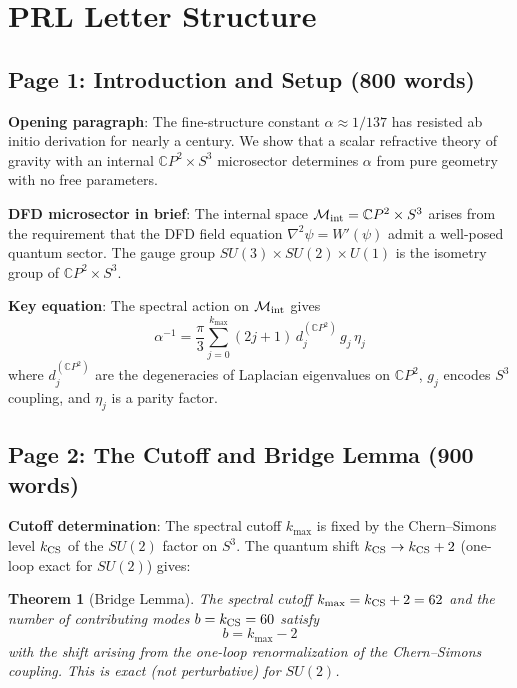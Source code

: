 \documentclass[11pt,a4paper]{article}
\newtheorem{theorem}{Theorem}
\newcommand{\CP}{\mathbb{C}P}
\begin{document}
\section{PRL Letter Structure}

\subsection{Page 1: Introduction and Setup (800 words)}

\textbf{Opening paragraph}: The fine-structure constant $\alpha \approx 1/137$ has resisted ab initio derivation for nearly a century. We show that a scalar refractive theory of gravity with an internal $\CP^2 \times S^3$ microsector determines $\alpha$ from pure geometry with no free parameters.

\textbf{DFD microsector in brief}: The internal space $\mathcal{M}_{\rm int} = \CP^2 \times S^3$ arises from the requirement that the DFD field equation $\nabla^2 \psi = W'(\psi)$ admit a well-posed quantum sector. The gauge group $SU(3) \times SU(2) \times U(1)$ is the isometry group of $\CP^2 \times S^3$.

\textbf{Key equation}: The spectral action on $\mathcal{M}_{\rm int}$ gives
\begin{equation}
\alpha^{-1} = \frac{\pi}{3} \sum_{j=0}^{k_{\max}} (2j+1) \, d_j^{(\CP^2)} \, g_j \, \eta_j
\label{eq:alpha-sum}
\end{equation}
where $d_j^{(\CP^2)}$ are the degeneracies of Laplacian eigenvalues on $\CP^2$, $g_j$ encodes $S^3$ coupling, and $\eta_j$ is a parity factor.

\subsection{Page 2: The Cutoff and Bridge Lemma (900 words)}

\textbf{Cutoff determination}: The spectral cutoff $k_{\max}$ is fixed by the Chern--Simons level $k_{\rm CS}$ of the $SU(2)$ factor on $S^3$. The quantum shift $k_{\rm CS} \to k_{\rm CS} + 2$ (one-loop exact for $SU(2)$) gives:

\begin{theorem}[Bridge Lemma]
The spectral cutoff $k_{\max} = k_{\rm CS} + 2 = 62$ and the number of contributing modes $b = k_{\rm CS} = 60$ satisfy
\begin{equation}
b = k_{\max} - 2
\end{equation}
with the shift arising from the one-loop renormalization of the Chern--Simons coupling. This is exact (not perturbative) for $SU(2)$.
\end{theorem}
\end{document}
